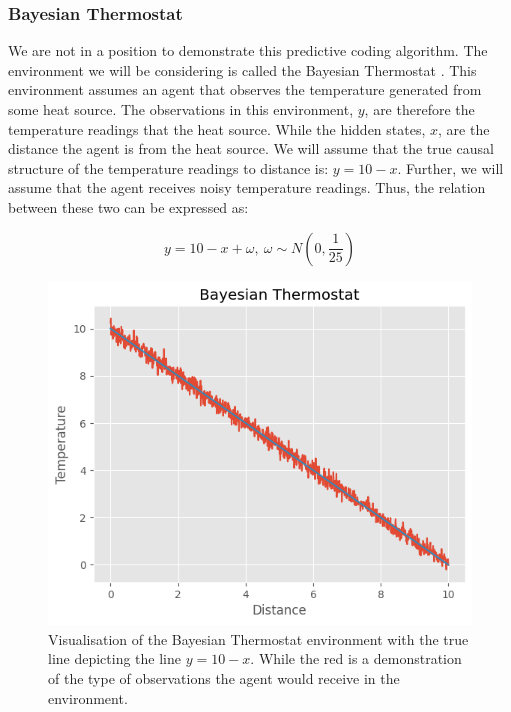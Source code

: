 \documentclass{article}
\begin{document}
\subsubsection{Bayesian Thermostat}

We are not in a position to demonstrate this predictive coding algorithm. The environment we will be considering is called the Bayesian Thermostat \citep{buckley2017free}. This environment assumes an agent that observes the temperature generated from some heat source. The observations in this environment, $y$, are therefore the temperature readings that the heat source. While the hidden states, $x$, are the distance the agent is from the heat source. We will assume that the true causal structure of the temperature readings to distance is: $y = 10 - x$. Further, we will assume that the agent receives noisy temperature readings. Thus, the relation between these two can be expressed as:

\begin{equation}\label{eq:bayesian_thermostat}
	y = 10 - x + \omega, \ \omega \sim N(0, \frac{1}{25})
\end{equation}

\begin{figure}[htbp]
    \centering
    \includegraphics[scale=0.55]{images/bayesian_theromostat.png}
    \caption{Visualisation of the Bayesian Thermostat environment with the true line depicting the line $y = 10 - x$. While the red is a demonstration of the type of observations the agent would receive in the environment.}
    \label{fig:bayesian_thermostat}
\end{figure}
\end{document}
